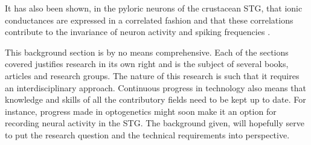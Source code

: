 It has also been shown, in the pyloric neurons of the crustacean \ac{STG}, that ionic conductances are expressed in a correlated fashion \cite{Temporal2012} and that these correlations contribute to the invariance of neuron activity and spiking frequencies \cite{Zhao2012}. 


This background section is by no means comprehensive. Each of the sections covered justifies research in its own right and is the subject of several books, articles and research groups. The nature of this research is such that it requires an interdisciplinary approach. Continuous progress in technology also means that knowledge and skills of all the contributory fields need to be kept up to date. For instance, progress made in optogenetics might soon make it an option for recording neural activity in the \ac{STG}. The background given, will hopefully serve to put the research question and the technical requirements into perspective.

